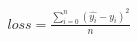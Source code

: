 \documentclass[10pt]{article}
\begin{document}
\begin{align*}loss = \frac{{\sum\limits_{i=0}^n} (\hat{y_i} - y_i)^2}{n}\end{align*}
\end{document}

